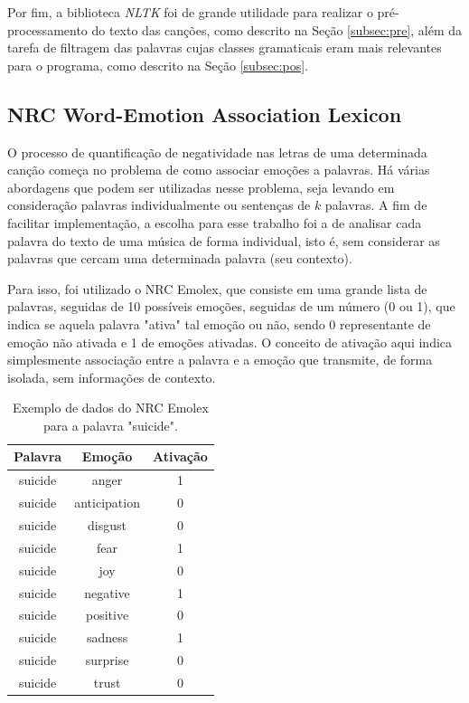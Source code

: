 Por fim, a biblioteca \textit{NLTK} \cite{Perkins:1953497} foi de grande utilidade para realizar o pré-processamento do texto das canções, como
descrito na Seção \ref{subsec:pre}, além da tarefa de filtragem das
palavras cujas classes gramaticais eram mais relevantes para o programa,
como descrito na Seção \ref{subsec:pos}.

\subsection{NRC Word-Emotion Association Lexicon} \label{subsec:nrc}

O processo de quantificação de negatividade nas letras de uma determinada
canção começa no problema de como associar emoções a palavras. Há várias
abordagens que podem ser utilizadas nesse problema, seja levando em 
consideração palavras individualmente ou sentenças de $ k $ palavras. 
A fim de facilitar implementação, a escolha para esse trabalho foi a de
analisar cada palavra do texto de uma música de forma individual, isto é,
sem considerar as palavras que cercam uma determinada palavra (seu contexto).

Para isso, foi utilizado o NRC Emolex, que consiste em uma grande lista de
palavras, seguidas de 10 possíveis emoções, seguidas de um número (0 ou 1),
que indica se aquela palavra "ativa" tal emoção ou não, sendo 0 representante
de emoção não ativada e 1 de emoções ativadas. O conceito de ativação aqui
indica simplesmente associação entre a palavra e a emoção que transmite, de 
forma isolada, sem informações de contexto.

\begin{table}[h]
	\centering
	\begin{tabular}{|c|c|c|}
		\hline
		\textbf{Palavra} & \textbf{Emoção} & \textbf{Ativação} \\ \hline
		suicide & anger & 1 \\ \hline
		suicide & anticipation & 0 \\ \hline
		suicide & disgust & 0 \\ \hline
		suicide & fear & 1 \\ \hline
		suicide & joy & 0 \\ \hline
		suicide & negative & 1 \\ \hline
		suicide & positive & 0 \\ \hline
		suicide & sadness & 1 \\ \hline
		suicide & surprise & 0 \\ \hline
		suicide & trust & 0 \\ \hline
	\end{tabular}
	\caption{\label{tab:emolexword} Exemplo de dados do NRC Emolex para a 
	palavra "suicide".}
\end{table}

